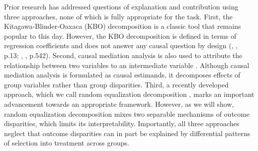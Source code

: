 \documentclass[12pt,a4paper]{article}
\begin{document}
Prior research has addressed questions of explanation and contribution using three approaches, none of which is fully appropriate for the task. 
First, the Kitagawa-Blinder-Oaxaca (KBO) decomposition \citep{kitagawa_components_1955, blinder_wage_1973, oaxaca_male-female_1973} is a classic tool that remains popular to this day. 
However, the KBO decomposition is defined in terms of regression coefficients and does not answer any causal question by design (\citeauthor{fortin_decomposition_2011}, \citeyear{fortin_decomposition_2011}, p.13; \citeauthor{lundberg_what_2021}, \citeyear{lundberg_what_2021}, p.542). Second, causal mediation analysis is also used to attribute the relationship between two variables to an intermediate variable \citep{vanderweele_explanation_2015}. Although causal mediation analysis is formulated as causal estimands, it decomposes effects of group variables rather than group disparities. Third, a recently developed approach, which we call random equalization decomposition \citep{vanderweele_causal_2014, jackson_decomposition_2018, lundberg_gap-closing_2022}, marks an important advancement towards an appropriate framework. However, as we will show, random equalization decomposition mixes two separable mechanisms of outcome disparities, which limits its interpretability. Importantly, all three approaches neglect that outcome disparities can in part be explained by differential patterns of selection into treatment across groups. 
\end{document}
